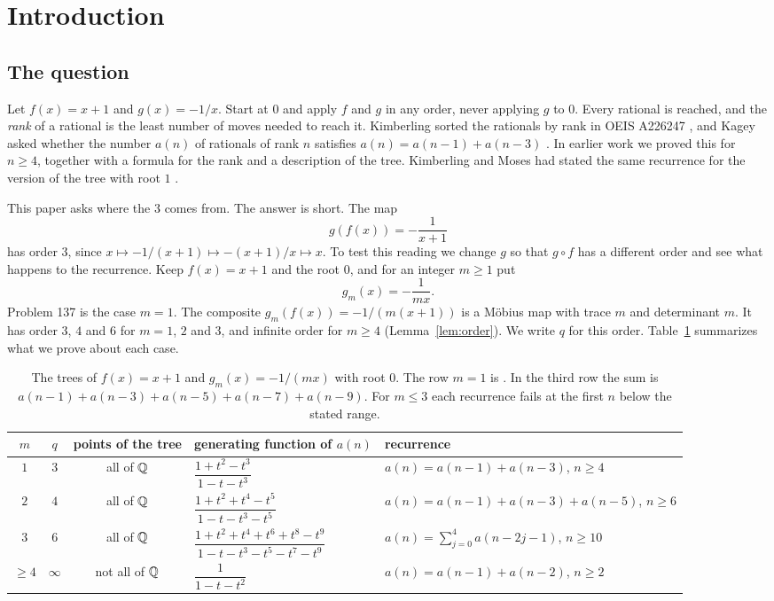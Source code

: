 \section{Introduction}\label{sec:intro}

\subsection{The question}

Let $f(x)=x+1$ and $g(x)=-1/x$. Start at $0$ and apply $f$ and $g$ in any order, never applying $g$
to $0$. Every rational is reached, and the \emph{rank} of a rational is the least number of moves
needed to reach it. Kimberling sorted the rationals by rank in OEIS A226247 \cite{oeisA226247}, and
Kagey asked whether the number $a(n)$ of rationals of rank $n$ satisfies $a(n)=a(n-1)+a(n-3)$
\cite{kagey-mse,kagey137}. In earlier work \cite{P137} we proved this for $n\ge4$, together with a
formula for the rank and a description of the tree. Kimberling and Moses had stated the same
recurrence for the version of the tree with root $1$ \cite[Example~4.2]{kimberling-moses}.

This paper asks where the $3$ comes from. The answer is short. The map
\[
g(f(x))=-\frac{1}{x+1}
\]
has order $3$, since $x\mapsto-1/(x+1)\mapsto-(x+1)/x\mapsto x$. To test this reading we change $g$
so that $g\circ f$ has a different order and see what happens to the recurrence. Keep $f(x)=x+1$ and
the root $0$, and for an integer $m\ge1$ put
\[
g_m(x)=-\frac{1}{mx}.
\]
Problem 137 is the case $m=1$. The composite $g_m(f(x))=-1/(m(x+1))$ is a M\"obius map with
trace $m$ and determinant $m$. It has order $3$, $4$ and $6$ for $m=1$, $2$ and $3$, and infinite
order for $m\ge4$ (Lemma~\ref{lem:order}). We write $q$ for this order. Table~\ref{tab:family}
summarizes what we prove about each case.

\begin{table}[ht]
\centering\small
\renewcommand{\arraystretch}{1.15}
\begin{tabular}{@{}c c c l l@{}}
\toprule
$m$ & $q$ & points of the tree & generating function of $a(n)$ & recurrence\\
\midrule
$1$ & $3$ & all of $\mathbb{Q}$ & $\dfrac{1+t^2-t^3}{1-t-t^3}$ & $a(n)=a(n-1)+a(n-3)$, $n\ge4$\\[8pt]
$2$ & $4$ & all of $\mathbb{Q}$ & $\dfrac{1+t^2+t^4-t^5}{1-t-t^3-t^5}$ & $a(n)=a(n-1)+a(n-3)+a(n-5)$, $n\ge6$\\[8pt]
$3$ & $6$ & all of $\mathbb{Q}$ & $\dfrac{1+t^2+t^4+t^6+t^8-t^9}{1-t-t^3-t^5-t^7-t^9}$ &
  $a(n)=\sum_{j=0}^{4}a(n-2j-1)$, $n\ge10$\\[8pt]
$\ge4$ & $\infty$ & not all of $\mathbb{Q}$ & $\dfrac{1}{1-t-t^2}$ & $a(n)=a(n-1)+a(n-2)$, $n\ge2$\\
\bottomrule
\end{tabular}
\caption{The trees of $f(x)=x+1$ and $g_m(x)=-1/(mx)$ with root $0$. The row $m=1$ is
\cite{P137}. In the third row the sum is $a(n-1)+a(n-3)+a(n-5)+a(n-7)+a(n-9)$. For $m\le3$ each
recurrence fails at the first $n$ below the stated range.}
\label{tab:family}
\end{table}

